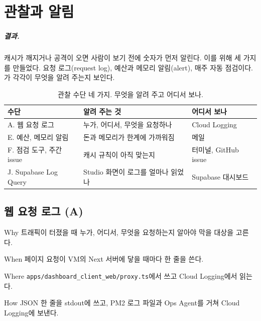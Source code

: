 \chapter{관찰과 알림}\label{ch:observability}

\paragraph{결과.}
캐시가 깨지거나 공격이 오면 사람이 보기 전에 숫자가 먼저 알린다.
이를 위해 세 가지를 만들었다.
요청 로그(request log), 예산과 메모리 알림(alert), 매주 자동 점검이다.
가 각각이 무엇을 알려 주는지 보인다.

\begin{table}[H]
  \caption{관찰 수단 네 가지. 무엇을 알려 주고 어디서 보나.}\label{tab:06-summary}
  \small
  \begin{tabularx}{\linewidth}{L{3.4cm} Y Y}
    \toprule
    수단 & 알려 주는 것 & 어디서 보나 \\
    \midrule
    A. 웹 요청 로그 & 누가, 어디서, 무엇을 요청하나 & Cloud Logging  \\
    \midrule
    E. 예산, 메모리 알림 & 돈과 메모리가 한계에 가까워짐 & 메일 \\
    \midrule
    F. 점검 도구, 주간 issue & 캐시 규칙이 아직 맞는지 & 터미널, GitHub issue \\
    \midrule
    J. Supabase Log Query & Studio 화면이 로그를 얼마나 읽었나 & Supabase 대시보드 \\
    \bottomrule
  \end{tabularx}
\end{table}

\section{웹 요청 로그 (A)}\label{sec:06-requestlog}

\begin{inbrief}
  \item[Why] 트래픽이 터졌을 때 누가, 어디서, 무엇을 요청하는지 알아야 막을 대상을 고른다.
  \item[When] 페이지 요청이 VM의 Next 서버에 닿을 때마다 한 줄을 쓴다.
  \item[Where] \texttt{apps/dashboard\_client\_web/proxy.ts}에서 쓰고 Cloud Logging에서 읽는다.
  \item[How] JSON 한 줄을 stdout에 쓰고, PM2 로그 파일과 Ops Agent를 거쳐 Cloud Logging에 보낸다.
\end{inbrief}

